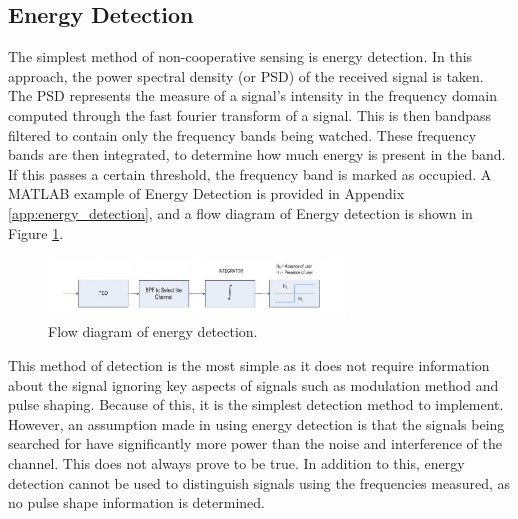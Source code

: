 \subsection{Energy Detection}
The simplest method of non-cooperative sensing is energy detection. In this approach, the power spectral density (or PSD) of the received signal is taken\cite{sensing_energy}. The PSD represents the measure of a signal’s intensity in the frequency domain computed through the fast fourier transform of a signal. This is then bandpass filtered to contain only the frequency bands being watched. These frequency bands are then integrated, to determine how much energy is present in the band. If this passes a certain threshold, the frequency band is marked as occupied. A MATLAB example of Energy Detection is provided in Appendix \ref{app:energy_detection}, and a flow diagram of Energy detection is shown in Figure \ref{fig:energy_detection}.
\begin{figure}[ht]
\centering
\includegraphics[width=0.70\textwidth]{img/energy_detection.png}
\caption{Flow diagram of energy detection.}
\label{fig:energy_detection}
\end{figure}\par

This method of detection is the most simple as it does not require information about the signal ignoring key aspects of signals such as modulation method and pulse shaping. Because of this, it is the simplest detection method to implement. However, an assumption made in using energy detection is that the signals being searched for have significantly more power than the noise and interference of the channel. This does not always prove to be true. In addition to this, energy detection cannot be used to distinguish signals using the frequencies measured, as no pulse shape information is determined.

